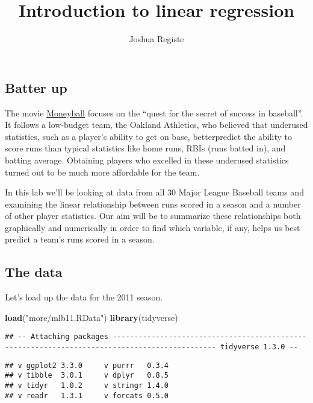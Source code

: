 \documentclass[
]{article}
\title{Introduction to linear regression}
\author{Joshua Registe}
\date{}
\newenvironment{Shaded}{\begin{snugshade}}{\end{snugshade}}
\newcommand{\KeywordTok}[1]{\textcolor[rgb]{0.13,0.29,0.53}{\textbf{#1}}}
\newcommand{\NormalTok}[1]{#1}
\newcommand{\StringTok}[1]{\textcolor[rgb]{0.31,0.60,0.02}{#1}}
\begin{document}
\maketitle

\hypertarget{batter-up}{%
\subsection{Batter up}\label{batter-up}}

The movie
\href{http://en.wikipedia.org/wiki/Moneyball_(film)}{Moneyball} focuses
on the ``quest for the secret of success in baseball''. It follows a
low-budget team, the Oakland Athletics, who believed that underused
statistics, such as a player's ability to get on base, betterpredict the
ability to score runs than typical statistics like home runs, RBIs (runs
batted in), and batting average. Obtaining players who excelled in these
underused statistics turned out to be much more affordable for the team.

In this lab we'll be looking at data from all 30 Major League Baseball
teams and examining the linear relationship between runs scored in a
season and a number of other player statistics. Our aim will be to
summarize these relationships both graphically and numerically in order
to find which variable, if any, helps us best predict a team's runs
scored in a season.

\hypertarget{the-data}{%
\subsection{The data}\label{the-data}}

Let's load up the data for the 2011 season.

\begin{Shaded}
\begin{Highlighting}[]
\KeywordTok{load}\NormalTok{(}\StringTok{"more/mlb11.RData"}\NormalTok{)}
\KeywordTok{library}\NormalTok{(tidyverse)}
\end{Highlighting}
\end{Shaded}

\begin{verbatim}
## -- Attaching packages ---------------------------------------------------------------------------------------------- tidyverse 1.3.0 --
\end{verbatim}

\begin{verbatim}
## v ggplot2 3.3.0     v purrr   0.3.4
## v tibble  3.0.1     v dplyr   0.8.5
## v tidyr   1.0.2     v stringr 1.4.0
## v readr   1.3.1     v forcats 0.5.0
\end{verbatim}
\end{document}
